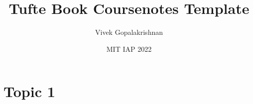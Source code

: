 \documentclass[letter,twoside,openany]{tufte-book}
\title{Tufte Book Coursenotes Template}
\author{Vivek Gopalakrishnan}
\date{MIT IAP 2022}
\begin{document}
\maketitle
\tableofcontents
\newpage



\part{Topic 1}

\end{document}
